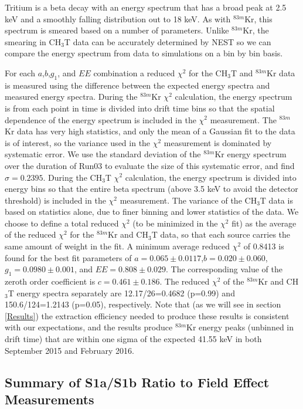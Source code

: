 Tritium is a beta decay with an energy spectrum that has a broad peak at 2.5 keV and a smoothly falling distribution out to 18 keV.  As with $^{83m}$Kr, this spectrum is smeared based on a number of parameters.  Unlike $^{83m}$Kr, the smearing in CH$_3$T data can be accurately determined by NEST so we can compare the energy spectrum from data to simulations on a bin by bin basis. 

For each $a$,$b$,$g_1$, and $EE$ combination a reduced $\chi^2$ for the CH$_3$T and $^{83m}$Kr data is measured using the difference between the expected energy spectra and measured energy spectra.   During the $^{83m}$Kr $\chi^2$ calculation, the energy spectrum is from each point in time is divided into drift time bins so that the spatial dependence of the energy spectrum is included in the $\chi^2$ measurement.  The $^{83m}$Kr data has very high statistics, and only the mean of a Gaussian fit to the data is of interest, so the variance used in the $\chi^2$  measurement  is dominated by systematic error.  We use the standard deviation of the $^{83m}$Kr energy spectrum over the duration of Run03 to evaluate the size of this systematic error, and find $\sigma = 0.2395$.  During the CH$_3$T $\chi^2$  calculation, the energy spectrum is divided into energy bins so that the entire beta spectrum (above 3.5 keV to avoid the detector threshold) is included in the $\chi^2$ measurement.  The variance of the CH$_3$T data is based on statistics alone, due to finer binning and lower statistics of the data.  We choose to define a total reduced $\chi^2$ (to be minimized in the $\chi^2$ fit) as the average of the reduced $\chi^2$ for the $^{83m}$Kr and CH$_3$T data, so that each source carries the same amount of weight in the fit. A minimum average reduced  $\chi^2$ of 0.8413 is found for the best fit parameters of $a=0.065 \pm 0.0117$,$b=0.020 \pm 0.060$,$g_1=0.0980 \pm 0.001$, and $EE=0.808 \pm 0.029$. The corresponding value of the zeroth order coefficient is $c=0.461 \pm 0.186$.  The reduced $\chi^2$ of the $^{83m}$Kr and CH$_3$T energy spectra separately are 12.17/26=0.4682 (p=0.99) and 150.6/124=1.2143 (p=0.05), respectively. Note that (as we will see in section \ref{Results}) the extraction efficiency needed to produce these results is consistent with our expectations, and the results produce $^{83m}$Kr energy peaks (unbinned in drift time) that are within one sigma of the expected 41.55 keV in both September 2015 and February 2016. 


\subsection{Summary of S1a/S1b Ratio to Field Effect Measurements}

